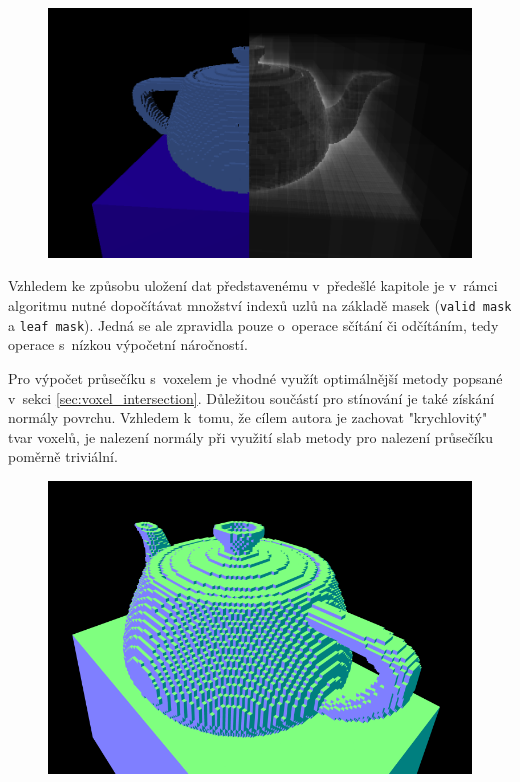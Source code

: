 \begin{figure}[H]
	\centering
	\includegraphics[scale=1]{obrazky-figures/color_iter_svo.png}
	\captionsetup{justification=centering}
	\label{fig:octree_child}
\end{figure}

Vzhledem ke způsobu uložení dat představenému v~předešlé kapitole je v~rámci algoritmu nutné dopočítávat množství indexů uzlů na základě masek (\texttt{valid mask} a \texttt{leaf mask}). Jedná se ale zpravidla pouze o~operace sčítání či odčítáním, tedy operace s~nízkou výpočetní náročností.

Pro výpočet průsečíku s~voxelem je vhodné využít optimálnější metody popsané v~sekci \ref{sec:voxel_intersection}. Důležitou součástí pro stínování je také získání normály povrchu. Vzhledem k~tomu, že cílem autora je zachovat "krychlovitý" tvar voxelů, je nalezení normály při využití slab metody pro nalezení průsečíku poměrně triviální.

\begin{figure}[H]
	\centering
	\includegraphics[scale=1]{obrazky-figures/normals_teapot.png}
	\captionsetup{justification=centering}
	\label{fig:octree_child}
\end{figure}

